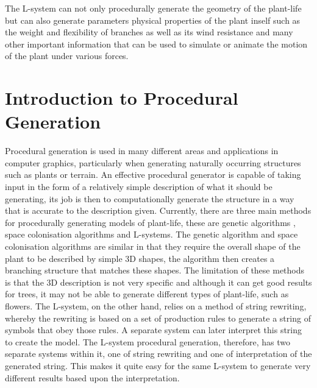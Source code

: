 The L-system can not only procedurally generate the geometry of the plant-life but can also generate parameters physical properties of the plant inself such as the weight and flexibility of branches as well as its wind resistance and many other important information that can be used to simulate or animate the motion of the plant under various forces.  

\section{Introduction to Procedural Generation}

Procedural generation is used in many different areas and applications in computer graphics, particularly when generating naturally occurring structures such as plants or terrain. An effective procedural generator is capable of taking input in the form of a relatively simple description of what it should be generating, its job is then to computationally generate the structure in a way that is accurate to the description given. Currently, there are three main methods for procedurally generating models of plant-life, these are genetic algorithms \cite{haubenwallner2017shapegenetics}, space colonisation algorithms\cite{juuso2017procedural} and L-systems. The genetic algorithm and space colonisation algorithms are similar in that they require the overall shape of the plant to be described by simple 3D shapes, the algorithm then creates a branching structure that matches these shapes. The limitation of these methods is that the 3D description is not very specific and although it can get good results for trees, it may not be able to generate different types of plant-life, such as flowers. The L-system, on the other hand, relies on a method of string rewriting, whereby the rewriting is based on a set of production rules to generate a string of symbols that obey those rules. A separate system can later interpret this string to create the model. The L-system procedural generation, therefore, has two separate systems within it, one of string rewriting and one of interpretation of the generated string. This makes it quite easy for the same L-system to generate very different results based upon the interpretation.\\

